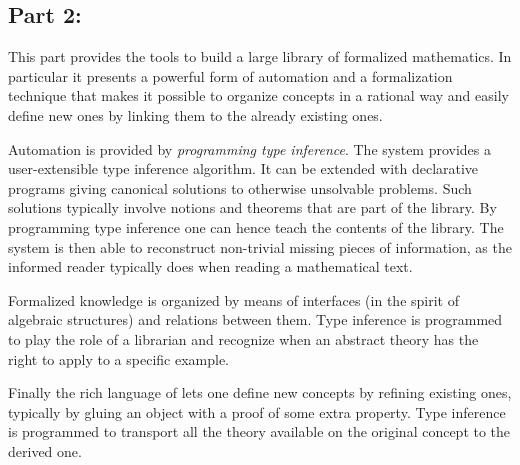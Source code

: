 
\subsection*{Part 2: \parttwoname{}}

This part provides the tools to build a large library of formalized
mathematics.  In particular it presents a powerful form of automation
and a formalization technique that makes it possible to organize
concepts in a rational way and easily define new ones by linking them
to the already existing ones.

Automation is provided by \emph{programming type inference}.
The \Coq{} system provides a user-extensible type inference
algorithm.  It can be extended with declarative programs
giving canonical solutions to otherwise unsolvable problems.
Such solutions typically involve notions and theorems that
are part of the \mcbMC{} library.  By programming type inference
one can hence teach \Coq{} the contents of the library.  The system
is then able to reconstruct non-trivial missing pieces of information,
as the informed reader typically does when reading a mathematical text.

Formalized knowledge is organized by means of interfaces (in the spirit of
algebraic structures) and relations between them.  Type inference is programmed
to play the role of a librarian and recognize when an abstract theory has the
right to apply to a specific example.

Finally the rich language of \Coq{} lets one define new concepts
by refining existing ones, typically by gluing an object with
a proof of some extra property.  Type inference is programmed
to transport all the theory available on
the original concept to the derived one.



